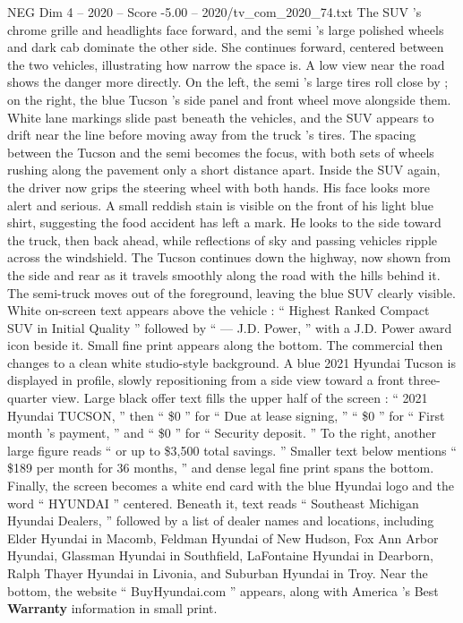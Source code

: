\begin{textsample}{NEG Dim 4 – 2020 – Score -5.00 – 2020/tv\_com\_2020\_74.txt}
The SUV ’s chrome grille and headlights face forward, and the semi ’s large polished wheels and dark cab dominate the other side.
She continues forward, centered between the two vehicles, illustrating how narrow the space is.
A low view near the road shows the danger more directly.
On the left, the semi ’s large tires roll close by ; on the right, the blue Tucson ’s side panel and front wheel move alongside them.
White lane markings slide past beneath the vehicles, and the SUV appears to drift near the line before moving away from the truck ’s tires.
The spacing between the Tucson and the semi becomes the focus, with both sets of wheels rushing along the pavement only a short distance apart.
Inside the SUV again, the driver now grips the steering wheel with both hands.
His face looks more alert and serious.
A small reddish stain is visible on the front of his light blue shirt, suggesting the food accident has left a mark.
He looks to the side toward the truck, then back ahead, while reflections of sky and passing vehicles ripple across the windshield.
The Tucson continues down the highway, now shown from the side and rear as it travels smoothly along the road with the hills behind it.
The semi-truck moves out of the foreground, leaving the blue SUV clearly visible.
White on-screen text appears above the vehicle : “ Highest Ranked Compact SUV in Initial Quality ” followed by “ — J.D.
Power, ” with a J.D.
Power award icon beside it.
Small fine print appears along the bottom.
The commercial then changes to a clean white studio-style background.
A blue 2021 Hyundai Tucson is displayed in profile, slowly repositioning from a side view toward a front three-quarter view.
Large black offer text fills the upper half of the screen : “ 2021 Hyundai TUCSON, ” then “ \$0 ” for “ Due at lease signing, ” “ \$0 ” for “ First month ’s payment, ” and “ \$0 ” for “ Security deposit. ” To the right, another large figure reads “ or up to \$3,500 total savings. ” Smaller text below mentions “ \$189 per month for 36 months, ” and dense legal fine print spans the bottom.
Finally, the screen becomes a white end card with the blue Hyundai logo and the word “ HYUNDAI ” centered.
Beneath it, text reads “ Southeast Michigan Hyundai Dealers, ” followed by a list of dealer names and locations, including Elder Hyundai in Macomb, Feldman Hyundai of New Hudson, Fox Ann Arbor Hyundai, Glassman Hyundai in Southfield, LaFontaine Hyundai in Dearborn, Ralph Thayer Hyundai in Livonia, and Suburban Hyundai in Troy.
Near the bottom, the website “ BuyHyundai.com ” appears, along with America ’s Best \textbf{Warranty} information in small print.

\end{textsample}
